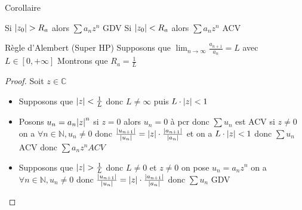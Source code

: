 \documentclass[11pt,hidelinks]{book}
\theoremstyle{mytheoremstyle}
\theoremstyle{mytheoremstyle}
\theoremstyle{mytheoremstyle}
\theoremstyle{mytheoremstyle}
\theoremstyle{mytheoremstyle}
\theoremstyle{mytheoremstyle}
\theoremstyle{mytheoremstyle}
\theoremstyle{mytheoremstyle}
\theoremstyle{myproblemstyle}
\def\mbb#1{\mathbb{#1}}
\def\bN{\mbb{N}}
\def\bC{\mbb{C}}
\def\z{$z \in \bC$}
\def\fn{\forall n \in \bN,}
\def\ln{\lim_{n \to \infty}}
\begin{document}
\begin{adjustwidth}{-2em}{-1em}
\begin{theorem}
    \end{theorem}
    \begin{prop}{Corollaire}
        \begin{enumerate}
         Si $\abs{z_0} > R_a$ alors $\sum a_n z^n$ GDV  
         Si $\abs{z_0} < R_a$ alors $\sum a_n z^n$ ACV 
        \end{enumerate}
    \end{prop}
    \begin{prop}{Règle d'Alembert (Super HP)}
        Supposons que $\ln \frac{a_{n+1}}{a_n} = L$ avec $L \in [0, +\infty]$
        Montrons que $R_a = \frac{1}{L}$ 
        \begin{proof}
            Soit \z
            \begin{itemize}[label=$\cdot$]

            \item Supposons que $\abs{z} < \frac{1}{L}$ donc $L \not= \infty$
            puis $L \cdot \abs{z} < 1$ 

            \item Posons $u_n = a_n \abs{z}^n$ si $z=0$ alors $u_n = 0$ à pcr donc $\sum u_n$ est ACV 
            si $z \not= 0$ on a $\forall n \in \bN, u_n \not= 0$ 
            donc $\frac{\abs{u_{n+1}}}{\abs{u_n}} = \abs{z} \cdot \frac{\abs{a_{n+1}}}{\abs{a_n}}$ et on a $L \cdot \abs{z} < 1$
            donc $\sum u_n$ ACV donc $\sum a_n  z^n ACV$ 

            \item Supposons que $\abs{z} > \frac{1}{L}$ donc $L \not= 0$ et $z \not= 0$
            on pose $u_n = a_n z^n$ on a $\fn u_n \not= 0$ 
            donc $\frac{\abs{u_{n+1}}}{\abs{u_n}} = \abs{z} \cdot \frac{\abs{a_{n+1}}}{\abs{a_n}}$ 
            donc $\sum u_n$ GDV
             

\end{itemize}
\end{proof}
\end{prop}
\end{adjustwidth}
\end{document}
